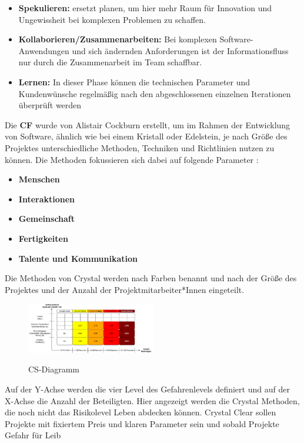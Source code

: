 \begin{itemize}
    \item \textbf{Spekulieren:} ersetzt planen, um hier mehr Raum für Innovation und Ungewissheit bei komplexen Problemen zu schaffen.
    \item \textbf{Kollaborieren/Zusammenarbeiten:} Bei komplexen Software-Anwendungen und sich ändernden Anforderungen ist der Informationsfluss nur durch die Zusammenarbeit im Team schaffbar.
    \item \textbf{Lernen:} In dieser Phase können die technischen Parameter und Kundenwünsche regelmäßig nach den abgeschlossenen einzelnen Iterationen überprüft werden
\end{itemize}
\cite{Alnoukari2008-ro,Abdelaziz2015-lb}
\newline
Die \textbf{CF} wurde von Alistair Cockburn erstellt, um im Rahmen der Entwicklung von Software, ähnlich wie bei einem Kristall oder Edelstein, 
je nach Größe des Projektes unterschiedliche Methoden, Techniken und Richtlinien nutzen zu können. Die Methoden fokussieren sich 
dabei auf folgende Parameter \cite{Ibrahim2020-ip}:
\begin{itemize}
    \item \textbf{Menschen}
    \item \textbf{Interaktionen} 
    \item \textbf{Gemeinschaft}    
    \item \textbf{Fertigkeiten}
    \item \textbf{Talente und Kommunikation }
\end{itemize}
Die Methoden von Crystal werden nach Farben benannt und nach der Größe des Projektes und der Anzahl der Projektmitarbeiter*Innen eingeteilt.
\begin{figure}
    \centering
    \caption{CS-Diagramm}
        \includegraphics[width=0.5\textwidth]{fig/CSD.png}
        \label{fig:CS-diagram}
    \end{figure}
Auf der Y-Achse werden die vier Level des Gefahrenlevels definiert und auf der X-Achse die Anzahl der Beteiligten. 
Hier angezeigt werden die Crystal Methoden, die noch nicht das Risikolevel Leben abdecken können. 
Crystal Clear sollen Projekte mit fixiertem Preis und klaren Parameter sein und sobald Projekte Gefahr für Leib 
